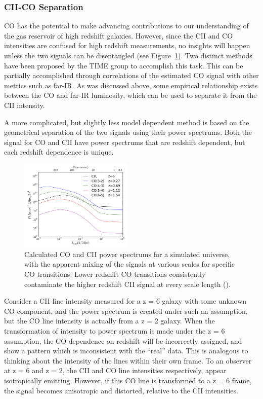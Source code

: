 \documentclass[manuscript]{aastex}
\begin{document}
\subsubsection{\textbf{CII-CO Separation}}
CO has the potential to make advancing contributions to our understanding of the gas reservoir of high redshift galaxies. However, since the CII and CO intensities are confused for high redshift measurements, no insights will happen unless the two signals can be disentangled (see Figure~\ref{fig:coc2}). Two distinct methods have been proposed by the TIME group to accomplish this task. This can be partially accomplished through correlations of the estimated CO signal with other metrics such as far-IR. As was discussed above, some empirical relationship exists between the CO and far-IR luminosity, which can be used to separate it from the CII intensity.  

A more complicated, but slightly less model dependent method is based on the geometrical separation of the two signals using their power spectrums. Both the signal for CO and CII have power spectrums that are redshift dependent, but each redshift dependence is unique. 
\begin{figure}
\vspace{-0.8cm}
  \begin{center}
    \includegraphics[width=0.48\textwidth]{cheng1.png}
  \end{center}
  \caption[Calculated CO and CII power spectrums, showing the difficulty in separating the two signals. -(\cite{Cheng2016})]{Calculated CO and CII power spectrums for a simulated universe, with the apparent mixing of the signals at various scales for specific CO transitions. Lower redshift CO transitions consistently contaminate the higher redshift CII signal at every scale length (\cite{Cheng2016}).}
  \label{fig:coc2}
\end{figure}
Consider a CII line intensity measured for a z = 6 galaxy with some unknown CO component, and the power spectrum is created under such an assumption, but the CO line intensity is actually from a z = 2 galaxy. When the transformation of intensity to power spectrum is made under the z = 6 assumption, the CO dependence on redshift will be incorrectly assigned, and show a pattern which is inconsistent with the ``real'' data. This is analogous to thinking about the intensity of the lines within their own frame. To an observer at z = 6 and z = 2, the CII and CO line intensities respectively, appear isotropically emitting. However, if this CO line is transformed to a z = 6 frame, the signal becomes anisotropic and distorted, relative to the CII intensities.  
\end{document}
